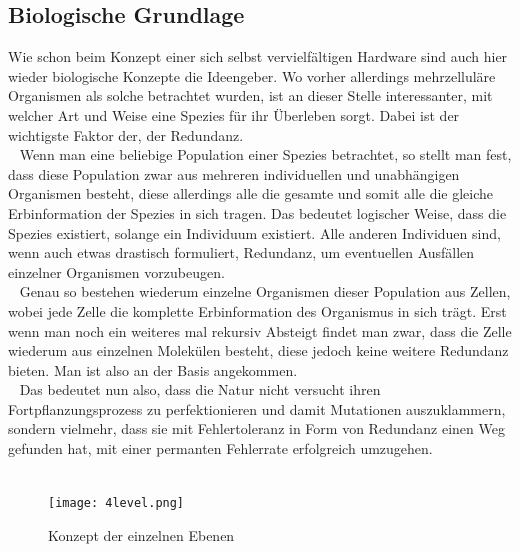 \documentclass[12p, a4]{article}
\begin{document}
\subsection{Biologische Grundlage}
Wie schon beim Konzept einer sich selbst vervielfältigen Hardware sind auch
hier wieder biologische Konzepte die Ideengeber. Wo vorher allerdings
mehrzelluläre Organismen als solche betrachtet wurden, ist an dieser Stelle
interessanter, mit welcher Art und Weise eine Spezies für ihr Überleben sorgt.
Dabei ist der wichtigste Faktor der, der Redundanz.\\
\ \newline
Wenn man eine beliebige Population einer Spezies betrachtet, so stellt
man fest, dass diese Population zwar aus mehreren individuellen und
unabhängigen Organismen besteht, diese allerdings alle die gesamte und somit
alle die gleiche Erbinformation der Spezies in sich tragen. Das bedeutet
logischer Weise, dass die Spezies existiert, solange ein Individuum existiert.
Alle anderen Individuen sind, wenn auch etwas drastisch formuliert,
Redundanz, um eventuellen Ausfällen einzelner Organismen vorzubeugen.\\
\ \newline
Genau so bestehen wiederum einzelne Organismen dieser Population aus Zellen,
wobei jede Zelle die komplette Erbinformation des Organismus in sich trägt.
Erst wenn man noch ein weiteres mal rekursiv Absteigt findet man zwar, dass
die Zelle wiederum aus einzelnen Molekülen besteht, diese jedoch keine
weitere Redundanz bieten. Man ist also an der Basis angekommen.\\
\ \newline
Das bedeutet nun also, dass die Natur nicht versucht ihren
Fortpflanzungsprozess zu perfektionieren und damit Mutationen auszuklammern,
sondern vielmehr, dass sie mit Fehlertoleranz in Form von Redundanz einen
Weg gefunden hat, mit einer permanten Fehlerrate erfolgreich umzugehen.\\
\ \newline
\begin{figure}[h]
  \centering
    \texttt{[image: 4level.png]}
  \caption{Konzept der einzelnen Ebenen}
  \label{}
\end{figure}
\end{document}
